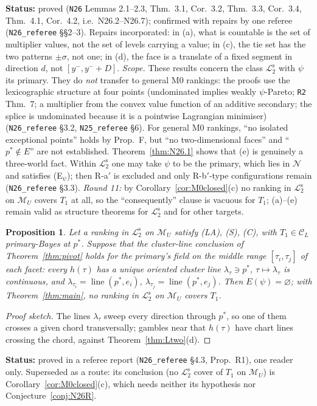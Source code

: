 \documentclass[11pt]{article}
\newtheorem{proposition}[theorem]{Proposition}
\theoremstyle{definition}
\theoremstyle{remark}
\newcommand{\M}{\mathcal M}
\newcommand{\C}{\mathcal C}
\newcommand{\lin}{\operatorname{line}}
\newcommand{\src}[1]{\texttt{#1}}
\newcommand{\status}[1]{\par\smallskip\noindent\textbf{Status:} #1\par\smallskip}
\newcommand{\Ltwo}{\mathcal L_2^{\mathrm s}}
\begin{document}
\status{proved (\src{N26} Lemmas 2.1--2.3, Thm.~3.1, Cor.~3.2, Thm.~3.3, Cor.~3.4, Thm.~4.1, Cor.~4.2, i.e.\ N26.2--N26.7); confirmed with repairs by one referee (\src{N26\_referee} \S\S2--3). Repairs incorporated: in (a), what is countable is the set of multiplier values, not the set of levels carrying a value; in (c), the tie set has the two patterns $\pm\sigma$, not one; in (d), the face is a translate of a fixed segment in direction $d$, not $[y^-,y^-+D]$. \emph{Scope.} These results concern the class $\Ltwo$ with $\psi$ its primary. They do \emph{not} transfer to general M0 rankings: the proofs use the lexicographic structure at four points (undominated implies weakly $\psi$-Pareto; \src{R2} Thm.~7; a multiplier from the convex value function of an additive secondary; the splice is undominated because it is a pointwise Lagrangian minimiser) (\src{N26\_referee} \S3.2, \src{N25\_referee} \S6). For general M0 rankings, ``no isolated exceptional points'' holds by Prop.~F, but ``no two-dimensional faces'' and ``$p^*\notin E$'' are not established. Theorem~\ref{thm:N26.1} shows that (e) is genuinely a three-world fact. Within $\Ltwo$ one may take $\psi$ to be the primary, which lies in $\mathcal N$ and satisfies (E$_\psi$); then R-a$'$ is excluded and only R-b$'$-type configurations remain (\src{N26\_referee} \S3.3). \emph{Round 11:} by Corollary~\ref{cor:M0closed}(c) no ranking in $\Ltwo$ on $\M_U$ covers $T_1$ at all, so the ``consequently'' clause is vacuous for $T_1$; (a)--(e) remain valid as structure theorems for $\Ltwo$ and for other targets.}

\begin{proposition}\label{prop:R1N26}
Let a ranking in $\Ltwo$ on $\M_U$ satisfy (LA), (S), (C), with $T_1\in\C_L$ primary-Bayes at $p^*$. Suppose that the cluster-line conclusion of Theorem~\ref{thm:pivot} holds for the primary's field on the middle range $[\tau_i,\tau_j]$ of each facet: every $h(\tau)$ has a unique oriented cluster line $\lambda_\tau\ni p^*$, $\tau\mapsto\lambda_\tau$ is continuous, and $\lambda_{\tau_i}=\lin(p^*,e_i)$, $\lambda_{\tau_j}=\lin(p^*,e_j)$. Then $E(\psi)=\varnothing$; with Theorem~\ref{thm:main}, no ranking in $\Ltwo$ on $\M_U$ covers $T_1$.
\end{proposition}
\begin{proof}[Proof sketch]
The lines $\lambda_\tau$ sweep every direction through $p^*$, so one of them crosses a given chord transversally; gambles near that $h(\tau)$ have chart lines crossing the chord, against Theorem~\ref{thm:Ltwo}(d).
\end{proof}
\status{proved in a referee report (\src{N26\_referee} \S4.3, Prop.~R1), one reader only. Superseded as a route: its conclusion (no $\Ltwo$ cover of $T_1$ on $\M_U$) is Corollary~\ref{cor:M0closed}(c), which needs neither its hypothesis nor Conjecture~\ref{conj:N26R}.}
\end{document}
